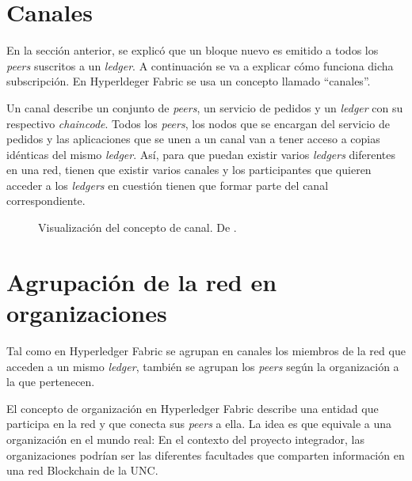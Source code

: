 \section{Canales}
En la sección anterior, se explicó que un bloque nuevo es emitido a todos los \textit{peers}  suscritos a un \textit{ledger}. A continuación se va a explicar cómo funciona dicha subscripción. En Hyperldeger Fabric se usa un concepto llamado ``canales''.

Un canal describe un conjunto de \textit{peers}, un servicio de pedidos y un \textit{ledger} con su respectivo \textit{chaincode}. Todos los \textit{peers}, los nodos que se encargan del servicio de pedidos y las aplicaciones que se unen a un canal van a tener acceso a copias idénticas del mismo \textit{ledger}. Así, para que puedan existir varios \textit{ledgers} diferentes en una red, tienen que existir varios canales y los participantes que quieren acceder a los \textit{ledgers} en cuestión tienen que formar parte del canal correspondiente.

\begin{figure}[H] %
\caption{Visualización del concepto de canal. De \cite{hlf-peers}.}
\label{fig:channels}
\end{figure}


\section{Agrupación de la red en organizaciones}

Tal como en Hyperledger Fabric se agrupan en canales los miembros de la red que acceden a un mismo \textit{ledger}, también se agrupan los \textit{peers}  según la organización a la que pertenecen.

El concepto de organización en Hyperledger Fabric describe una entidad que participa en la red y que conecta sus \textit{peers} a ella. La idea es que equivale a una organización en el mundo real: En el contexto del proyecto integrador, las organizaciones podrían ser las diferentes facultades que comparten información en una red Blockchain de la UNC.

